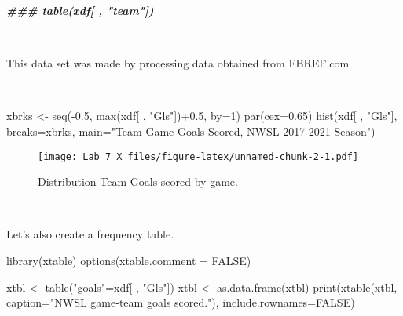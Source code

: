 \documentclass[
]{article}
\newenvironment{Shaded}{\begin{snugshade}}{\end{snugshade}}
\newcommand{\AttributeTok}[1]{\textcolor[rgb]{0.77,0.63,0.00}{#1}}
\newcommand{\ConstantTok}[1]{\textcolor[rgb]{0.00,0.00,0.00}{#1}}
\newcommand{\DecValTok}[1]{\textcolor[rgb]{0.00,0.00,0.81}{#1}}
\newcommand{\DocumentationTok}[1]{\textcolor[rgb]{0.56,0.35,0.01}{\textbf{\textit{#1}}}}
\newcommand{\FloatTok}[1]{\textcolor[rgb]{0.00,0.00,0.81}{#1}}
\newcommand{\FunctionTok}[1]{\textcolor[rgb]{0.00,0.00,0.00}{#1}}
\newcommand{\NormalTok}[1]{#1}
\newcommand{\OtherTok}[1]{\textcolor[rgb]{0.56,0.35,0.01}{#1}}
\newcommand{\SpecialCharTok}[1]{\textcolor[rgb]{0.00,0.00,0.00}{#1}}
\newcommand{\StringTok}[1]{\textcolor[rgb]{0.31,0.60,0.02}{#1}}
\begin{document}
\begin{Shaded}
\begin{Highlighting}[]
\DocumentationTok{\#\#\# table(xdf[ , "team"])}
\end{Highlighting}
\end{Shaded}

~~

This data set was made by processing data obtained from FBREF.com

~~

\begin{Shaded}
\begin{Highlighting}[]
\NormalTok{xbrks }\OtherTok{\textless{}{-}} \FunctionTok{seq}\NormalTok{(}\SpecialCharTok{{-}}\FloatTok{0.5}\NormalTok{, }\FunctionTok{max}\NormalTok{(xdf[ , }\StringTok{"Gls"}\NormalTok{])}\SpecialCharTok{+}\FloatTok{0.5}\NormalTok{, }\AttributeTok{by=}\DecValTok{1}\NormalTok{)}
\FunctionTok{par}\NormalTok{(}\AttributeTok{cex=}\FloatTok{0.65}\NormalTok{)}
\FunctionTok{hist}\NormalTok{(xdf[ , }\StringTok{"Gls"}\NormalTok{], }\AttributeTok{breaks=}\NormalTok{xbrks, }\AttributeTok{main=}\StringTok{"Team{-}Game Goals Scored, NWSL 2017{-}2021 Season"}\NormalTok{)}
\end{Highlighting}
\end{Shaded}

\begin{figure}
\centering
\texttt{[image: Lab\_7\_X\_files/figure-latex/unnamed-chunk-2-1.pdf]}
\caption{Distribution Team Goals scored by game.}
\end{figure}

~~

Let's also create a frequency table.

\begin{Shaded}
\begin{Highlighting}[]
\FunctionTok{library}\NormalTok{(xtable)}
\FunctionTok{options}\NormalTok{(}\AttributeTok{xtable.comment =} \ConstantTok{FALSE}\NormalTok{)}

\NormalTok{xtbl }\OtherTok{\textless{}{-}} \FunctionTok{table}\NormalTok{(}\StringTok{"goals"}\OtherTok{=}\NormalTok{xdf[ , }\StringTok{"Gls"}\NormalTok{])}
\NormalTok{xtbl }\OtherTok{\textless{}{-}} \FunctionTok{as.data.frame}\NormalTok{(xtbl)}
\FunctionTok{print}\NormalTok{(}\FunctionTok{xtable}\NormalTok{(xtbl, }\AttributeTok{caption=}\StringTok{"NWSL game{-}team goals scored."}\NormalTok{), }\AttributeTok{include.rownames=}\ConstantTok{FALSE}\NormalTok{)}
\end{Highlighting}
\end{Shaded}
\end{document}
